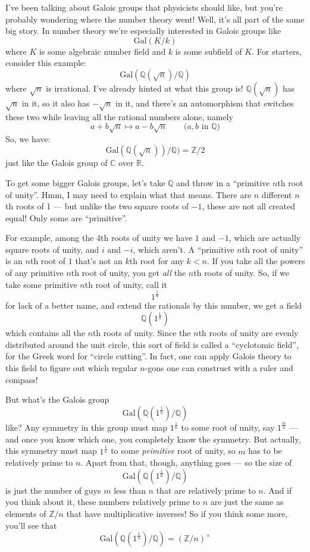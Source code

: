 \documentclass{article}
\begin{document}
I've been talking about Galois groups that physicists should like, but
you're probably wondering where the number theory went! Well, it's all
part of the same big story. In number theory we're especially interested
in Galois groups like \[\mathrm{Gal}(K/k)\] where \(K\) is some
algebraic number field and \(k\) is some subfield of \(K\). For
starters, consider this example:
\[\mathrm{Gal}(\mathbb{Q}(\sqrt{n})/\mathbb{Q})\] where \(\sqrt{n}\) is
irrational. I've already hinted at what this group is!
\(\mathbb{Q}(\sqrt{n})\) has \(\sqrt{n}\) in it, so it also has
\(-\sqrt{n}\) in it, and there's an automorphism that switches these two
while leaving all the rational numbers alone, namely
\[a + b \sqrt{n} \mapsto a - b \sqrt{n} \qquad \mbox{($a,b$ in $\mathbb{Q}$)}\]
So, we have:
\[\mathrm{Gal}(\mathbb{Q}(\sqrt{n}))/\mathbb{Q}) = \mathbb{Z}/2\] just
like the Galois group of \(\mathbb{C}\) over \(\mathbb{R}\).

To get some bigger Galois groups, let's take \(\mathbb{Q}\) and throw in
a ``primitive \(n\)th root of unity''. Hmm, I may need to explain what
that means. There are \(n\) different \(n\)th roots of 1 --- but unlike
the two square roots of \(-1\), these are not all created equal! Only
some are ``primitive''.

For example, among the 4th roots of unity we have \(1\) and \(-1\),
which are actually square roots of unity, and \(i\) and \(-i\), which
aren't. A ``primitive \(n\)th root of unity'' is an \(n\)th root of
\(1\) that's not an \(k\)th root for any \(k < n\). If you take all the
powers of any primitive \(n\)th root of unity, you get \emph{all} the
\(n\)th roots of unity. So, if we take some primitive \(n\)th root of
unity, call it \[1^{\frac1n}\] for lack of a better name, and extend the
rationals by this number, we get a field \[\mathbb{Q}(1^{\frac1n})\]
which contains all the \(n\)th roots of unity. Since the \(n\)th roots
of unity are evenly distributed around the unit circle, this sort of
field is called a ``cyclotomic field'', for the Greek word for ``circle
cutting''. In fact, one can apply Galois theory to this field to figure
out which regular \(n\)-gons one can construct with a ruler and compass!

But what's the Galois group
\[\mathrm{Gal}(\mathbb{Q}(1^{\frac1n})/\mathbb{Q})\] like? Any symmetry
in this group must map \(1^{\frac1n}\) to some root of unity, say
\(1^{\frac{m}{n}}\) --- and once you know which one, you completely know
the symmetry. But actually, this symmetry must map \(1^{\frac1n}\) to
some \emph{primitive} root of unity, so \(m\) has to be relatively prime
to \(n\). Apart from that, though, anything goes --- so the size of
\[\mathrm{Gal}(\mathbb{Q}(1^{\frac1n})/\mathbb{Q})\] is just the number
of guys \(m\) less than \(n\) that are relatively prime to \(n\). And if
you think about it, these numbers relatively prime to \(n\) are just the
same as elements of \(\mathbb{Z}/n\) that have multiplicative inverses!
So if you think some more, you'll see that
\[\mathrm{Gal}(\mathbb{Q}(1^{\frac1n})/\mathbb{Q}) = (\mathbb{Z}/n)^\times\]
\end{document}
